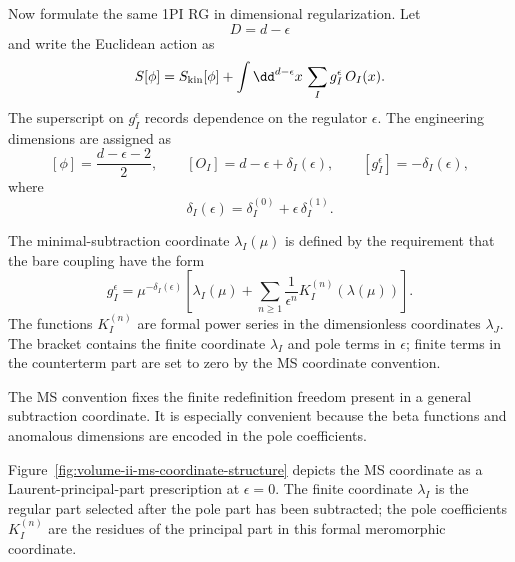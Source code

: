 Now formulate the same 1PI RG in dimensional regularization.  Let
\[
  D=d-\epsilon
\]
and write the Euclidean action as
\[
  S[\phi]
  =
  S_{\rm kin}[\phi]
  +
  \int\dd^{d-\epsilon}x\,
  \sum_I g_I^\epsilon\,O_I(x).
\]
The superscript on \(g_I^\epsilon\) records dependence on the regulator
\(\epsilon\).  The engineering dimensions are assigned as
\[
  [\phi]=\frac{d-\epsilon-2}{2},
  \qquad
  [O_I]=d-\epsilon+\delta_I(\epsilon),
  \qquad
  [g_I^\epsilon]=-\delta_I(\epsilon),
\]
where
\[
  \delta_I(\epsilon)=\delta_I^{(0)}+\epsilon\,\delta_I^{(1)}.
\]

\begin{definition}
The minimal-subtraction coordinate \(\lambda_I(\mu)\) is defined by the
requirement that the bare coupling have the form
\[
  g_I^\epsilon
  =
  \mu^{-\delta_I(\epsilon)}
  \left[
    \lambda_I(\mu)
    +
    \sum_{n\ge1}
    \frac{1}{\epsilon^n}
    K_I^{(n)}(\lambda(\mu))
  \right].
\]
The functions \(K_I^{(n)}\) are formal power series in the dimensionless
coordinates \(\lambda_J\).  The bracket contains the finite coordinate
\(\lambda_I\) and pole terms in \(\epsilon\); finite terms in the counterterm
part are set to zero by the MS coordinate convention.
\end{definition}

The MS convention fixes the finite redefinition freedom present in a general
subtraction coordinate.  It is especially convenient because the beta functions
and anomalous dimensions are encoded in the pole coefficients.

Figure~\ref{fig:volume-ii-ms-coordinate-structure} depicts the MS coordinate
as a Laurent-principal-part prescription at \(\epsilon=0\).  The finite
coordinate \(\lambda_I\) is the regular part selected after the pole part has
been subtracted; the pole coefficients \(K_I^{(n)}\) are the residues of the
principal part in this formal meromorphic coordinate.

